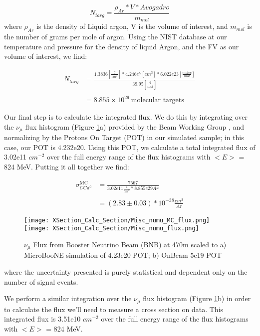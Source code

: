 \begin{equation} \label{eq:1}
  N_{targ} = \frac{\rho_{Ar} * V * Avogadro}{m_{mol}} 
\end{equation}
\noindent where $\rho_{Ar}$ is the density of Liquid argon, V is the volume of interest, and $m_{mol}$ is the number of grams per mole of argon.  Using the NIST database at our temperature and pressure for the density of liquid Argon, and the FV as our volume of interest, we find: 

\begin{align}
N_{targ} &= \frac{1.3836 [\frac{g}{cm^3}] * 4.246e7 [cm^3] * 6.022e23 [\frac{molec}{mol}]}{39.95 [\frac{g}{mol}]} \\\\
&= 8.855\times10^{29}~\text{molecular targets}
\end{align}

\par Our final step is to calculate the integrated flux.  We do this by integrating over the $\nu_\mu$ flux histogram (Figure \ref{fig:flux}a) provided by the Beam Working Group \cite{bib:flux}, and normalizing by the Protons On Target (POT) in our simulated sample; in this case, our POT is 4.232e20.  Using this POT, we calculate a total integrated flux of 3.02e11 $cm^{-2}$ over the full energy range of the flux histograms with $<E>$ = 824 MeV. 
\noindent Putting it all together we find:


\begin{align}
\sigma^{\text{MC}}_{CC\pi^0} &= \frac{7567}{3.02e11 \frac{1}{cm^2} * 8.855e29 Ar } \\\\
&= (2.83 \pm 0.03) *10^{-38} \frac{cm^2}{Ar}
\end{align}

\begin{figure}[h!]
\centering
\texttt{[image: XSection\_Calc\_Section/Misc\_numu\_MC\_flux.png]}
\texttt{[image: XSection\_Calc\_Section/Misc\_numu\_flux.png]}

\caption{$\nu_\mu$ Flux from Booster Neutrino Beam (BNB) at 470m scaled to a) MicroBooNE simulation of 4.23e20 POT; b) OnBeam 5e19 POT}
\label{fig:flux}
\end{figure}

\noindent where the uncertainty presented is purely statistical and dependent only on the number of signal events.  

\par We perform a similar integration over the $\nu_\mu$ flux histogram (Figure \ref{fig:flux}b) in order to calculate the flux we'll need to measure a cross section on data. This integrated flux is 3.51e10 $cm^{-2}$ over the full energy range of the flux histograms with $<E>$ = 824 MeV. 

